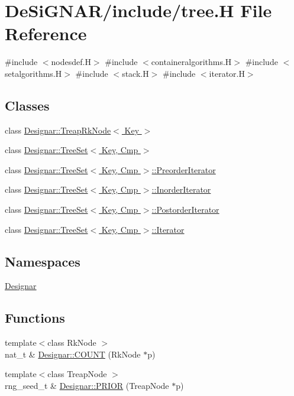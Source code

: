 \hypertarget{tree_8_h}{}\section{De\+Si\+G\+N\+A\+R/include/tree.H File Reference}
\label{tree_8_h}
{\ttfamily \#include $<$nodesdef.\+H$>$}\newline
{\ttfamily \#include $<$containeralgorithms.\+H$>$}\newline
{\ttfamily \#include $<$setalgorithms.\+H$>$}\newline
{\ttfamily \#include $<$stack.\+H$>$}\newline
{\ttfamily \#include $<$iterator.\+H$>$}\newline
\subsection*{Classes}
\begin{DoxyCompactItemize}
\item 
class \hyperlink{class_designar_1_1_treap_rk_node}{Designar\+::\+Treap\+Rk\+Node$<$ Key $>$}
\item 
class \hyperlink{class_designar_1_1_tree_set}{Designar\+::\+Tree\+Set$<$ Key, Cmp $>$}
\item 
class \hyperlink{class_designar_1_1_tree_set_1_1_preorder_iterator}{Designar\+::\+Tree\+Set$<$ Key, Cmp $>$\+::\+Preorder\+Iterator}
\item 
class \hyperlink{class_designar_1_1_tree_set_1_1_inorder_iterator}{Designar\+::\+Tree\+Set$<$ Key, Cmp $>$\+::\+Inorder\+Iterator}
\item 
class \hyperlink{class_designar_1_1_tree_set_1_1_postorder_iterator}{Designar\+::\+Tree\+Set$<$ Key, Cmp $>$\+::\+Postorder\+Iterator}
\item 
class \hyperlink{class_designar_1_1_tree_set_1_1_iterator}{Designar\+::\+Tree\+Set$<$ Key, Cmp $>$\+::\+Iterator}
\end{DoxyCompactItemize}
\subsection*{Namespaces}
\begin{DoxyCompactItemize}
\item 
 \hyperlink{namespace_designar}{Designar}
\end{DoxyCompactItemize}
\subsection*{Functions}
\begin{DoxyCompactItemize}
\item 
{\footnotesize template$<$class Rk\+Node $>$ }\\nat\+\_\+t \& \hyperlink{namespace_designar_a473e1d283b3fd0a75ec0c645eeb7818d}{Designar\+::\+C\+O\+U\+NT} (Rk\+Node $\ast$p)
\item 
{\footnotesize template$<$class Treap\+Node $>$ }\\rng\+\_\+seed\+\_\+t \& \hyperlink{namespace_designar_a0189c4d8fbe8db0c8189d80989a4e9ca}{Designar\+::\+P\+R\+I\+OR} (Treap\+Node $\ast$p)
\end{DoxyCompactItemize}
